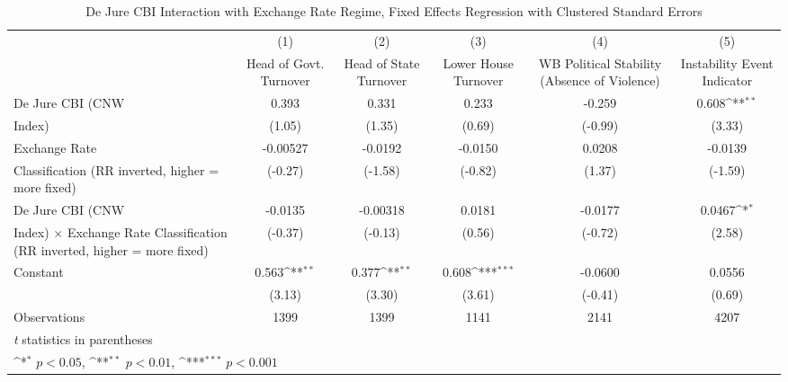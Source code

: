 \begin{table}[htbp]\centering
\def\sym#1{\ifmmode^{#1}\else\(^{#1}\)\fi}
\caption{De Jure CBI Interaction with Exchange Rate Regime, Fixed Effects Regression with Clustered Standard Errors \label{imultIndFEDJ}}
\begin{tabular}{l*{5}{c}}
\hline\hline
                    &\multicolumn{1}{c}{(1)}&\multicolumn{1}{c}{(2)}&\multicolumn{1}{c}{(3)}&\multicolumn{1}{c}{(4)}&\multicolumn{1}{c}{(5)}\\
                    &\multicolumn{1}{c}{Head of Govt. Turnover}&\multicolumn{1}{c}{Head of State Turnover}&\multicolumn{1}{c}{Lower House Turnover}&\multicolumn{1}{c}{WB Political Stability (Absence of Violence)}&\multicolumn{1}{c}{Instability Event Indicator}\\
\hline
De Jure CBI (CNW    &       0.393         &       0.331         &       0.233         &      -0.259         &       0.608\sym{**} \\
Index)              &      (1.05)         &      (1.35)         &      (0.69)         &     (-0.99)         &      (3.33)         \\
[1em]
Exchange Rate       &    -0.00527         &     -0.0192         &     -0.0150         &      0.0208         &     -0.0139         \\
Classification (RR inverted, higher = more fixed)&     (-0.27)         &     (-1.58)         &     (-0.82)         &      (1.37)         &     (-1.59)         \\
[1em]
De Jure CBI (CNW    &     -0.0135         &    -0.00318         &      0.0181         &     -0.0177         &      0.0467\sym{*}  \\
Index) $\times$ Exchange Rate Classification (RR inverted, higher = more fixed)&     (-0.37)         &     (-0.13)         &      (0.56)         &     (-0.72)         &      (2.58)         \\
[1em]
Constant            &       0.563\sym{**} &       0.377\sym{**} &       0.608\sym{***}&     -0.0600         &      0.0556         \\
                    &      (3.13)         &      (3.30)         &      (3.61)         &     (-0.41)         &      (0.69)         \\
\hline
Observations        &        1399         &        1399         &        1141         &        2141         &        4207         \\
\hline\hline
\multicolumn{6}{l}{\footnotesize \textit{t} statistics in parentheses}\\
\multicolumn{6}{l}{\footnotesize \sym{*} \(p<0.05\), \sym{**} \(p<0.01\), \sym{***} \(p<0.001\)}\\
\end{tabular}
\end{table}

